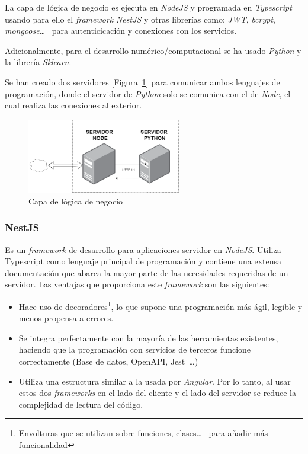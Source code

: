 La capa de lógica de negocio es ejecuta en \textit{NodeJS} y programada en \textit{Typescript} usando para ello el \textit{framework} \textit{NestJS} y otras librerías como: \textit{JWT}, \textit{bcrypt}, \textit{mongoose}\dots~ para autenticicación y conexiones con los servicios.

Adicionalmente, para el desarrollo numérico/computacional se ha usado \textit{Python} y la librería \textit{Sklearn}. 

Se han creado dos servidores [Figura~\ref{fig:servers_schema}] para comunicar ambos lenguajes de programación, donde el servidor de \textit{Python} solo se comunica con el de \textit{Node}, el cual realiza las conexiones al exterior.

\begin{figure}[h]
    \centering
    \includegraphics[width=0.6\textwidth, keepaspectratio]{imaxes/servers_schema.png}
    \caption{Capa de lógica de negocio}
    \label{fig:servers_schema}
\end{figure}

\subsubsection{NestJS~\cite{nestjs}}
Es un \textit{framework} de desarrollo para aplicaciones servidor en \textit{NodeJS}. Utiliza Typescript como lenguaje principal de programación y contiene una extensa documentación que abarca la mayor parte de las necesidades requeridas de un servidor.
Las ventajas que proporciona este \textit{framework} son las siguientes:

\begin{itemize}
\item Hace uso de decoradores\footnote{Envolturas que se utilizan sobre funciones, clases\dots~ para añadir más funcionalidad}, lo que supone una programación más ágil, legible y menos propensa a errores.
\item Se integra perfectamente con la mayoría de las herramientas existentes, haciendo que la programación con servicios de terceros funcione correctamente (Base de datos, OpenAPI, Jest~\dots)
\item Utiliza una estructura similar a la usada por \textit{Angular}. Por lo tanto, al usar estos dos \textit{frameworks} en el lado del cliente y el lado del servidor se reduce la complejidad de lectura del código.
\end{itemize}


